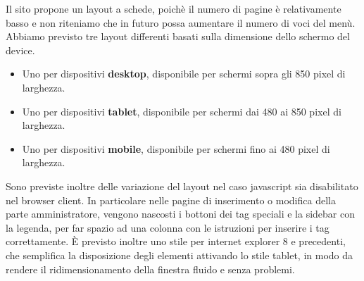 Il sito propone un layout a schede, poich\`e il numero di pagine \`e relativamente basso e non riteniamo che in futuro possa aumentare il numero di voci del men\`u.
Abbiamo previsto tre layout differenti basati sulla dimensione dello schermo del device. 
\begin{itemize}
	\item Uno per dispositivi {\bfseries desktop}, disponibile per schermi sopra gli 850 pixel di larghezza.
	\item Uno per dispositivi {\bfseries tablet}, disponibile per schermi dai 480 ai 850 pixel di larghezza.
	\item Uno per dispositivi {\bfseries mobile}, disponibile per schermi fino ai 480 pixel di larghezza.
\end{itemize}



Sono previste inoltre delle variazione del layout nel caso javascript sia disabilitato nel browser client. In particolare nelle pagine di inserimento o modifica della parte amministratore, vengono nascosti i bottoni dei tag speciali e la sidebar con la legenda, per far spazio ad una colonna con le istruzioni per inserire i tag correttamente.
\`E previsto inoltre uno stile per internet explorer 8 e precedenti, che semplifica la disposizione degli elementi attivando lo stile tablet, in modo da rendere il ridimensionamento della finestra fluido e senza problemi.

